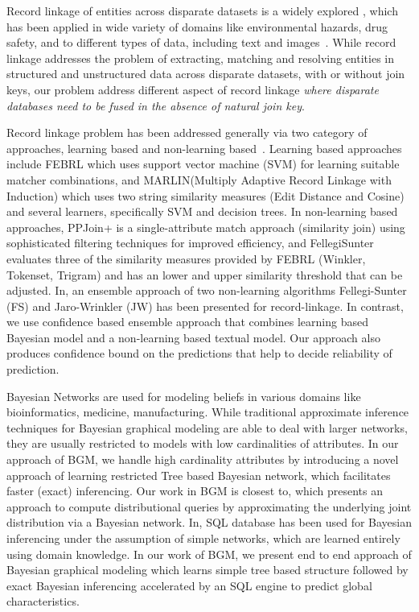 Record linkage of entities across disparate datasets is a widely explored \cite{brizan2015survey}, which has been applied in wide variety of domains like environmental hazards\cite{acheson1979record}, drug safety\cite{noren2005hit}, and to different types of data, including text\cite{li2005semantic} and images~\cite{huang1998object}. While record linkage addresses the problem of extracting, matching and resolving entities in structured and unstructured data\cite{getoor2012entity} across disparate datasets, with or without join keys, our problem address different aspect of record linkage \textit{where disparate databases need to be fused in the absence of natural join key}. 

Record linkage problem has been addressed generally via two category of approaches, learning based and non-learning based~\cite{kopcke2010evaluation}. Learning based approaches include FEBRL\cite{christen2008febrl} which uses support vector machine (SVM) for learning suitable matcher combinations, and MARLIN(Multiply Adaptive Record Linkage with
Induction)\cite{bilenko2003adaptive} which uses two string similarity measures (Edit Distance and Cosine) and several learners, specifically SVM and decision trees. In non-learning based approaches, PPJoin+\cite{xiao2011efficient} is a single-attribute match approach (similarity
join) using sophisticated filtering techniques for improved efficiency, and FellegiSunter\cite{fellegi1969theory} evaluates three of the similarity measures provided by FEBRL (Winkler, Tokenset, Trigram) and has an lower and upper similarity threshold that can be adjusted. In\cite{poon2016ensemble}, an ensemble approach of two non-learning algorithms Fellegi-Sunter (FS) and Jaro-Wrinkler (JW) has been presented for record-linkage. In contrast, we use confidence based ensemble approach that combines learning based Bayesian model and a non-learning based textual model. Our approach also produces confidence bound on the predictions that help to decide reliability of prediction.

Bayesian Networks are used for modeling beliefs in various domains like bioinformatics\cite{friedman2000using}, medicine\cite{uebersax2004genetic}, manufacturing\cite{singh2015predictive}. While traditional approximate inference techniques for Bayesian graphical modeling are able to deal with larger networks, they are usually restricted to models with low cardinalities of attributes. In our approach of BGM, we handle high cardinality attributes by introducing a novel approach of learning restricted Tree based Bayesian network, which facilitates faster (exact) inferencing.  Our work in BGM is closest to\cite{yadav2015business}, which presents an approach to compute distributional queries by approximating the underlying joint distribution via a Bayesian network. In\cite{yadav2015business}, SQL database has been used for Bayesian  inferencing under the assumption of simple networks, which are learned entirely using domain knowledge. In our work of BGM, we present end to end approach of Bayesian graphical modeling which learns simple tree based structure followed by exact Bayesian inferencing accelerated by an SQL engine to predict global characteristics.
